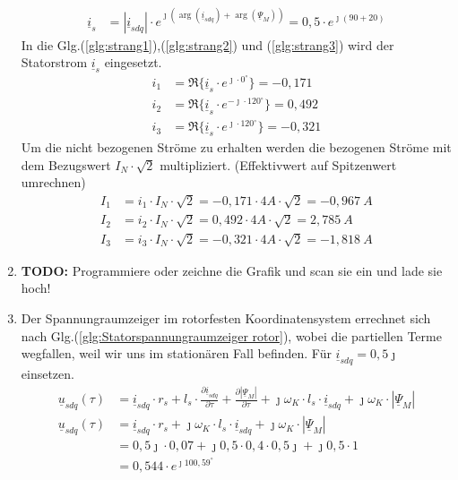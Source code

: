 \begin{solution}
\begin{enumerate}
\begin{align}
\underline{i}_{s} &= |\underline{i}_{sdq}| \cdot e^{\jmath (\arg(\underline{i}_{sdq}) + \arg(\underline{\Psi}_{M}))}= 0,5 \cdot e^{\jmath (90 + 20)}
\end{align}
In die Glg.(\ref{glg:strang1}),(\ref{glg:strang2}) und (\ref{glg:strang3}) wird der Statorstrom $\underline{i}_s$ eingesetzt.
\begin{align}
i_1 & = \Re \{ \underline{i}_s \cdot e^{\jmath \cdot 0 ^\circ} \} = -0,171\\
i_2 & = \Re \{ \underline{i}_s \cdot e^{-\jmath \cdot 120 ^\circ} \} = 0,492 \\
i_3 & = \Re \{ \underline{i}_s \cdot e^{\jmath \cdot 120 ^\circ} \}=  -0,321
\end{align}
Um die nicht bezogenen Ströme zu erhalten werden die bezogenen Ströme mit dem Bezugswert $I_N \cdot \sqrt{2}$ multipliziert. (Effektivwert auf Spitzenwert umrechnen)
\begin{align}
I_1 & = i_1 \cdot I_N \cdot \sqrt{2} = -0,171 \cdot 4 A \cdot \sqrt{2} =-0,967~A \\
I_2 & = i_2 \cdot I_N \cdot \sqrt{2} = 0,492 \cdot 4 A \cdot \sqrt{2} =2,785~A \\
I_3 & = i_3 \cdot I_N \cdot \sqrt{2} =-0,321 \cdot 4 A \cdot \sqrt{2} =-1,818~A
\end{align}
\item \textbf{TODO:} Programmiere oder zeichne die Grafik und scan sie ein und lade sie hoch!
\item Der Spannungraumzeiger im rotorfesten Koordinatensystem errechnet sich nach Glg.(\ref{glg:Statorspannungraumzeiger rotor}), wobei die partiellen Terme wegfallen, weil wir uns im stationären Fall befinden. Für $\underline{i}_{sdq}= 0,5 \jmath$ einsetzen.
\begin{align}
\underline{u}_{sdq}(\tau) &= \underline{i}_{sdq} \cdot r_s + l_s \cdot \frac{\partial \underline{i}_{sdq}}{\partial \tau} + \frac{\partial |\underline{\Psi}_M|}{\partial \tau} + \jmath \omega_K \cdot l_s \cdot \underline{i}_{sdq} + \jmath \omega_K \cdot |\underline{\Psi}_M|\\
\underline{u}_{sdq}(\tau) &= \underline{i}_{sdq} \cdot r_s + \jmath \omega_K \cdot l_s \cdot \underline{i}_{sdq} + \jmath \omega_K \cdot |\underline{\Psi}_M|\\
&= 0,5 \jmath \cdot 0,07 + \jmath 0,5 \cdot 0,4 \cdot 0,5 \jmath +\jmath 0,5 \cdot 1\\
&=0,544 \cdot e^{\jmath 100,59^\circ}
\end{align}
\end{enumerate}
\end{solution}